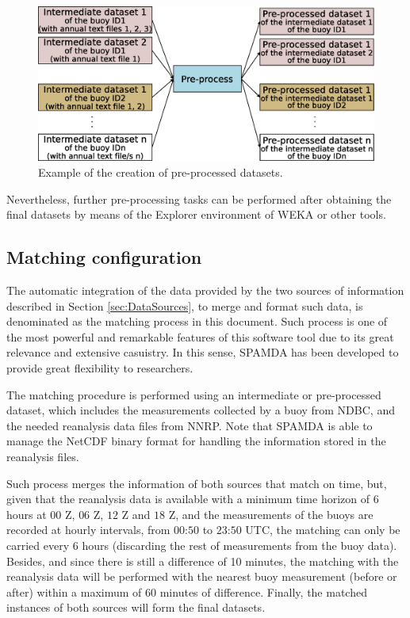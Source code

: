 \documentclass[energies,article,submit,moreauthors,pdftex]{Definitions/mdpi}
\begin{document}
				\begin{figure}[ht!]
					\centering
					\includegraphics[scale=0.40]{figures/FigurePreprocess.eps}
					\caption{Example of the creation of pre-processed datasets.}
					\label{fig:preprocess}
				\end{figure}
				
				Nevertheless, further pre-processing tasks can be performed after obtaining the final datasets by means of the Explorer environment of WEKA or other tools.
				
				
			\subsection{Matching configuration}
			\label{sec:matching_conf}
			
				The automatic integration of the data provided by the two sources of information described in Section \ref{sec:DataSources}, to merge and format such data, is denominated as the matching process in this document. Such process is one of the most powerful and remarkable features of this software tool due to its great relevance and extensive casuistry. In this sense, SPAMDA has been developed to provide great flexibility to researchers.
				
				The matching procedure is performed using an intermediate or pre-processed dataset, which includes the measurements collected by a buoy from NDBC, and the needed reanalysis data files from NNRP. Note that SPAMDA is able to manage the NetCDF binary format for handling the information stored in the reanalysis files.
				
				Such process merges the information of both sources that match on time, but, given that the reanalysis data is available with a minimum time horizon of $6$ hours at $00$ Z, $06$ Z, $12$ Z and $18$ Z, and the measurements of the buoys are recorded at hourly intervals, from $00$:$50$ to $23$:$50$ UTC, the matching can only be carried every $6$ hours (discarding the rest of measurements from the buoy data). Besides, and since there is still a difference of 10 minutes, the matching with the reanalysis data will be performed with the nearest buoy measurement (before or after) within a maximum of 60 minutes of difference. Finally, the matched instances of both sources will form the final datasets.
				
\end{document}
